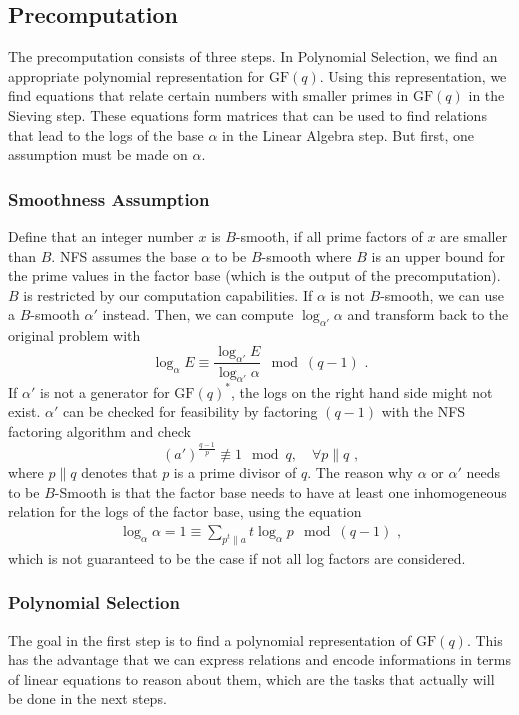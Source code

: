 \documentclass[paper=a4, fontsize=11pt]{scrartcl} %
\numberwithin{equation}{section} %
\numberwithin{figure}{section} %
\numberwithin{table}{section} %
\begin{document}
\subsection{Precomputation}
\label{subsec:precomputation}
The precomputation consists of three steps. In Polynomial Selection, we find an appropriate polynomial representation for $\mathrm{GF}(q)$. Using this representation, we find equations that relate certain numbers with smaller primes in $\mathrm{GF}(q)$ in the Sieving step. These equations form matrices that can be used to find relations that lead to the logs of the base $\alpha$ in the Linear Algebra step. But first, one assumption must be made on $\alpha$.

\subsubsection{Smoothness Assumption}
Define that an integer number $x$ is $B$-smooth, if all prime factors of $x$ are smaller than $B$. NFS assumes the base $\alpha$ to be $B$-smooth where $B$ is an upper bound for the prime values in the factor base (which is the output of the precomputation). $B$ is restricted by our computation capabilities. If $\alpha$ is not $B$-smooth, we can use a $B$-smooth $\alpha'$ instead. Then, we can compute $\log_{\alpha'}\alpha$ and transform back to the original problem with
\begin{equation}
\log_\alpha E\equiv\frac{\log_{\alpha'}E}{\log_{\alpha'}\alpha}\mod (q-1)
\text{ .}
\end{equation}
If $\alpha'$ is not a generator for $\mathrm{GF}(q)^*$, the logs on the right hand side might not exist. $\alpha'$ can be checked for feasibility by factoring $(q-1)$ with the NFS factoring algorithm and check
\begin{equation}
(a')^{\frac{q-1}{p}} \not\equiv 1 \mod q,\quad\forall p\parallel q
\text{ ,}
\end{equation}
where $p\parallel q$ denotes that $p$ is a prime divisor of $q$. The reason why $\alpha$ or $\alpha'$ needs to be $B$-Smooth is that the factor base needs to have at least one inhomogeneous relation for the logs of the factor base, using the equation
\begin{eqnarray}
\label{eqn:assumption}
\log_\alpha\alpha = 1 \equiv \sum_{p^t\parallel a}t\log_\alpha p \mod (q-1)
\text{ ,}
\end{eqnarray}
which is not guaranteed to be the case if not all log factors are considered.

\subsubsection{Polynomial Selection}
The goal in the first step is to find a polynomial representation of $\mathrm{GF}(q)$. This has the advantage that we can express relations and encode informations in terms of linear equations to reason about them, which are the tasks that actually will be done in the next steps.
\end{document}
